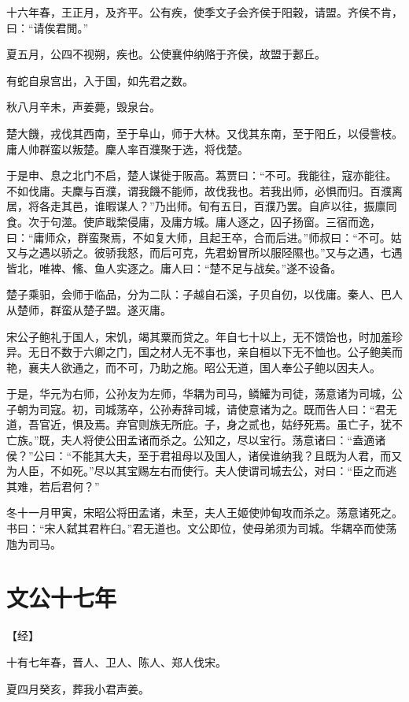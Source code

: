 \documentclass[a4paper,12pt,UTF8,twoside]{ctexbook}
\begin{document}
十六年春，王正月，及齐平。公有疾，使季文子会齐侯于阳穀，请盟。齐侯不肯，曰：“请俟君閒。”

夏五月，公四不视朔，疾也。公使襄仲纳赂于齐侯，故盟于郪丘。

有蛇自泉宫出，入于国，如先君之数。

秋八月辛未，声姜薨，毁泉台。

楚大饑，戎伐其西南，至于阜山，师于大林。又伐其东南，至于阳丘，以侵訾枝。庸人帅群蛮以叛楚。麇人率百濮聚于选，将伐楚。

于是申、息之北门不启，楚人谋徙于阪高。蒍贾曰：“不可。我能往，寇亦能往。不如伐庸。夫麇与百濮，谓我饑不能师，故伐我也。若我出师，必惧而归。百濮离居，将各走其邑，谁暇谋人？”乃出师。旬有五日，百濮乃罢。自庐以往，振廪同食。次于句澨。使庐戢棃侵庸，及庸方城。庸人逐之，囚子扬窗。三宿而逸，曰：“庸师众，群蛮聚焉，不如复大师，且起王卒，合而后进。”师叔曰：“不可。姑又与之遇以骄之。彼骄我怒，而后可克，先君蚡冒所以服陉隰也。”又与之遇，七遇皆北，唯裨、鯈、鱼人实逐之。庸人曰：“楚不足与战矣。”遂不设备。

楚子乘驲，会师于临品，分为二队：子越自石溪，子贝自仞，以伐庸。秦人、巴人从楚师，群蛮从楚子盟。遂灭庸。

宋公子鲍礼于国人，宋饥，竭其粟而贷之。年自七十以上，无不馈饴也，时加羞珍异。无日不数于六卿之门，国之材人无不事也，亲自桓以下无不恤也。公子鲍美而艳，襄夫人欲通之，而不可，乃助之施。昭公无道，国人奉公子鲍以因夫人。

于是，华元为右师，公孙友为左师，华耦为司马，鳞鱹为司徒，荡意诸为司城，公子朝为司寇。初，司城荡卒，公孙寿辞司城，请使意诸为之。既而告人曰：“君无道，吾官近，惧及焉。弃官则族无所庇。子，身之贰也，姑纾死焉。虽亡子，犹不亡族。”既，夫人将使公田孟诸而杀之。公知之，尽以宝行。荡意诸曰：“盍適诸侯？”公曰：“不能其大夫，至于君祖母以及国人，诸侯谁纳我？且既为人君，而又为人臣，不如死。”尽以其宝赐左右而使行。夫人使谓司城去公，对曰：“臣之而逃其难，若后君何？”

冬十一月甲寅，宋昭公将田孟诸，未至，夫人王姬使帅甸攻而杀之。荡意诸死之。书曰：“宋人弑其君杵臼。”君无道也。文公即位，使母弟须为司城。华耦卒而使荡虺为司马。

\section{文公十七年}



【经】

十有七年春，晋人、卫人、陈人、郑人伐宋。

夏四月癸亥，葬我小君声姜。
\end{document}
